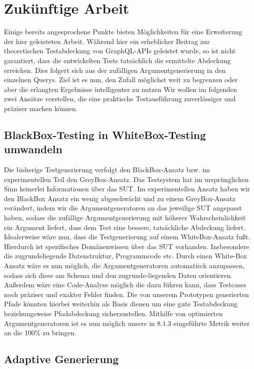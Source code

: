 \chapter{Zukünftige Arbeit}

Einige bereits angesprochene Punkte bieten Möglichkeiten für eine Erweiterung der hier geleisteten Arbeit.
Während hier ein erheblicher Beitrag zur theoretischen Testabdeckung von GraphQL-APIs geleistet wurde,
so ist nicht garantiert, dass die entwickelten Tests tatsächlich die ermittelte Abdeckung erreichen.
Dies folgert sich aus der zufälligen Argumentgenerierung in den einzelnen Querys.
Ziel ist es nun, den Zufall möglichst weit zu begrenzen oder aber die erlangten Ergebnisse intelligenter zu nutzen
Wir wollen im folgenden zwei Ansätze vorstellen, die eine praktische Testausführung zuverlässiger und
präziser machen können.

\section{BlackBox-Testing in WhiteBox-Testing umwandeln}

Die bisherige Testgenerierung verfolgt den BlackBox-Ansatz bzw. im experimentellen Teil den GreyBox-Ansatz.
Das Testsystem hat im ursprünglichen Sinn keinerlei Informationen über das SUT.
Im experimentellen Ansatz haben wir den BlackBox Ansatz ein wenig abgeschwächt und zu einem GreyBox-Ansatz verändert, indem wir
die Argumentgeneratoren an das jeweilige SUT angepasst haben, sodass die zufällige Argumentgenerierung mit höherer Wahrscheinlichkeit
ein Argument liefert, dass dem Test eine bessere, tatsächliche Abdeckung liefert.
Idealerweise wäre nun, dass die Testgenerierung auf einem WhiteBox-Ansatz fußt.
Hierdurch ist spezifisches Domänenwissen über das SUT vorhanden.
Insbesondere die zugrundeliegende Datenstruktur, Programmcode etc.
Durch einen White-Box Ansatz wäre es nun möglich, die Argumentgeneratoren automatisch anzupassen, sodass sich diese
am Schema und den zugrunde-liegenden Daten orientieren.
Außerdem wäre eine Code-Analyse möglich die dazu führen kann, dass Testcases noch präziser und exakter Fehler finden.
Die von unserem Prototypen generierten Pfade könnten hierbei weiterhin als Basis dienen um eine gute Testabdeckung beziehungsweise Pfadabdeckung sicherzustellen.
Mithilfe von optimierten Argumentgeneratoren ist es nun möglich unsere in $8.1.3$ eingeführte Metrik weiter an die 100\% zu bringen.

\section{Adaptive Generierung}

